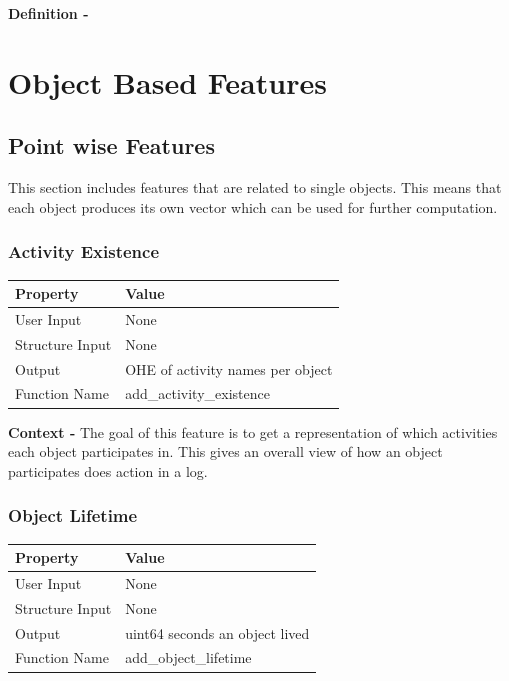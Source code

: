 \documentclass{article}
\begin{document}
\noindent\textbf{Definition -}

\section{Object Based Features}
\subsection{Point wise Features}
This section includes features that are related to single objects. This means that each object produces its own vector which can be used for further computation.
\subsubsection{Activity Existence}
\begin{center}
	\begin{tabular}{| p{3cm} p{7cm} |}
		\hline
		\textbf{Property} & \textbf{Value}\\
		\hline
		User Input & None\\
		Structure Input & None\\
		Output & OHE of activity names per object\\
		Function Name & add\_activity\_existence\\
		\hline
	\end{tabular}
\end{center}

\textbf{Context -} The goal of this feature is to get a representation of which activities each object participates in. This gives an overall view of how an object participates does action in a log.\\

\subsubsection{Object Lifetime}
\begin{center}
	\begin{tabular}{| p{3cm} p{7cm} |}
		\hline
		\textbf{Property} & \textbf{Value}\\
		\hline
		User Input & None\\
		Structure Input & None\\
		Output & uint64 seconds an object lived\\
		Function Name & add\_object\_lifetime\\
		\hline
	\end{tabular}
\end{center}
\end{document}
